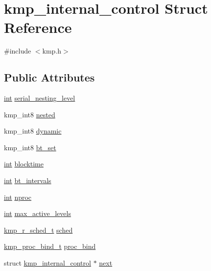 \hypertarget{structkmp__internal__control}{\section{kmp\-\_\-internal\-\_\-control Struct Reference}
\label{structkmp__internal__control}
}


{\ttfamily \#include $<$kmp.\-h$>$}

\subsection*{Public Attributes}
\begin{DoxyCompactItemize}
\item 
\hyperlink{ittnotify__static_8h_a8b8dcd723308a8cb5d84277c7a3fff70}{int} \hyperlink{structkmp__internal__control_aace7f1175db32707e8ad500ed5aea229}{serial\-\_\-nesting\-\_\-level}
\item 
kmp\-\_\-int8 \hyperlink{structkmp__internal__control_aa82c78dc9af4ec7faa03cbbbda0c845b}{nested}
\item 
kmp\-\_\-int8 \hyperlink{structkmp__internal__control_a0c375adc5d6b8f4b65fa6fe183bdcfc7}{dynamic}
\item 
kmp\-\_\-int8 \hyperlink{structkmp__internal__control_ad68ef2c72320d0d153cefa83fc6a1bec}{bt\-\_\-set}
\item 
\hyperlink{ittnotify__static_8h_a8b8dcd723308a8cb5d84277c7a3fff70}{int} \hyperlink{structkmp__internal__control_a8528f85a03edae1a87d0ee4c7b36c4f4}{blocktime}
\item 
\hyperlink{ittnotify__static_8h_a8b8dcd723308a8cb5d84277c7a3fff70}{int} \hyperlink{structkmp__internal__control_aef086c2ffe180b307a02488ca85a18ce}{bt\-\_\-intervals}
\item 
\hyperlink{ittnotify__static_8h_a8b8dcd723308a8cb5d84277c7a3fff70}{int} \hyperlink{structkmp__internal__control_a807067319fd06b644c3aecefadac01e6}{nproc}
\item 
\hyperlink{ittnotify__static_8h_a8b8dcd723308a8cb5d84277c7a3fff70}{int} \hyperlink{structkmp__internal__control_adb864475ccf4b80f3d928c0fd41e7a04}{max\-\_\-active\-\_\-levels}
\item 
\hyperlink{kmp_8h_a71396c1b9a5e1f45d20c0617948ce646}{kmp\-\_\-r\-\_\-sched\-\_\-t} \hyperlink{structkmp__internal__control_a39684c4ec5986537da3c14792fd003fb}{sched}
\item 
\hyperlink{kmp_8h_ae587debf3f0331e4f824daa05f47a241}{kmp\-\_\-proc\-\_\-bind\-\_\-t} \hyperlink{structkmp__internal__control_a17ef4ac8abe321e2d0ea11f730be3995}{proc\-\_\-bind}
\item 
struct \hyperlink{structkmp__internal__control}{kmp\-\_\-internal\-\_\-control} $\ast$ \hyperlink{structkmp__internal__control_a4860e215a4af81a65d3441cdf8b2fd97}{next}
\end{DoxyCompactItemize}


